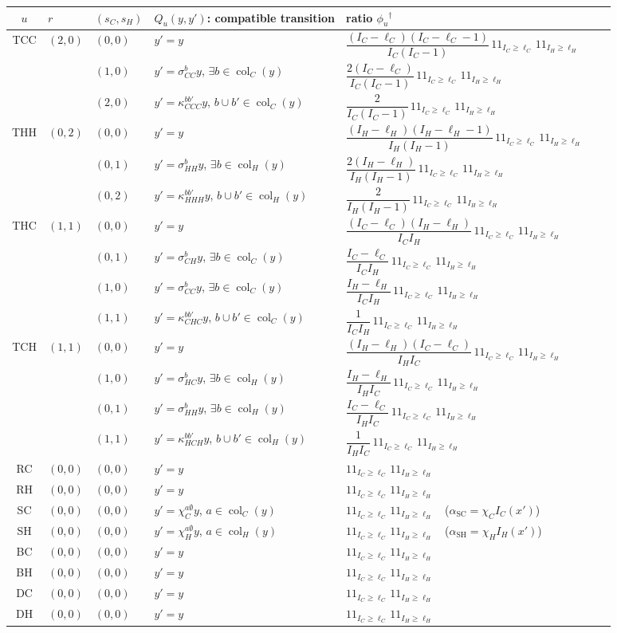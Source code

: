 \documentclass[11pt]{article}
\newcommand{\col}{\operatorname{col}}
\newcommand{\ind}{1\!\!1}
\newcommand{\Supp}{\ind_{I_C\ge\ell_C}\,\ind_{I_H\ge\ell_H}}
\theoremstyle{plain}
\begin{document}
\begin{center}
{\small
\renewcommand{\arraystretch}{1.5}
\begin{tabular}{clllllc}
\toprule
$u$ & $r$ & $(s_C,s_H)$ & $Q_u(y,y')$: compatible transition & ratio $\phi_u$$^\dagger$\\
\midrule
TCC & $(2,0)$ & $(0,0)$ & $y'=y$ & $\dfrac{(I_C-\ell_C)(I_C-\ell_C-1)}{I_C(I_C-1)}\,\Supp$\\
&& $(1,0)$ & $y'=\sigma^b_{CC}y$, $\exists b\in\col_C(y)$ & $\dfrac{2(I_C-\ell_C)}{I_C(I_C-1)}\,\Supp$\\
&& $(2,0)$ & $y'=\kappa^{bb'}_{CCC}y$, $b\cup b'\in\col_C(y)$ & $\dfrac{2}{I_C(I_C-1)}\,\Supp$\\
THH & $(0,2)$ & $(0,0)$ & $y'=y$ & $\dfrac{(I_H-\ell_H)(I_H-\ell_H-1)}{I_H(I_H-1)}\,\Supp$\\
&& $(0,1)$ & $y'=\sigma^b_{HH}y$, $\exists b\in\col_H(y)$ & $\dfrac{2(I_H-\ell_H)}{I_H(I_H-1)}\,\Supp$\\
&& $(0,2)$ & $y'=\kappa^{bb'}_{HHH}y$, $b\cup b'\in\col_H(y)$ & $\dfrac{2}{I_H(I_H-1)}\,\Supp$\\
THC & $(1,1)$ & $(0,0)$ & $y'=y$ & $\dfrac{(I_C-\ell_C)(I_H-\ell_H)}{I_CI_H}\,\Supp$\\
&& $(0,1)$ & $y'=\sigma^b_{CH}y$, $\exists b\in\col_C(y)$ & $\dfrac{I_C-\ell_C}{I_CI_H}\,\Supp$\\
&& $(1,0)$ & $y'=\sigma^b_{CC}y$, $\exists b\in\col_C(y)$ & $\dfrac{I_H-\ell_H}{I_CI_H}\,\Supp$\\
&& $(1,1)$ & $y'=\kappa^{bb'}_{CHC}y$, $b\cup b'\in\col_C(y)$ & $\dfrac{1}{I_CI_H}\,\Supp$\\
TCH & $(1,1)$ & $(0,0)$ & $y'=y$ & $\dfrac{(I_H-\ell_H)(I_C-\ell_C)}{I_HI_C}\,\Supp$\\
&& $(1,0)$ & $y'=\sigma^b_{HC}y$, $\exists b\in\col_H(y)$ & $\dfrac{I_H-\ell_H}{I_HI_C}\,\Supp$\\
&& $(0,1)$ & $y'=\sigma^b_{HH}y$, $\exists b\in\col_H(y)$ & $\dfrac{I_C-\ell_C}{I_HI_C}\,\Supp$\\
&& $(1,1)$ & $y'=\kappa^{bb'}_{HCH}y$, $b\cup b'\in\col_H(y)$ & $\dfrac{1}{I_HI_C}\,\Supp$\\
RC & $(0,0)$ & $(0,0)$ & $y'=y$ & $\Supp$\\
RH & $(0,0)$ & $(0,0)$ & $y'=y$ & $\Supp$\\
SC & $(0,0)$ & $(0,0)$ & $y'=\chi^{a\emptyset}_C y$, $a\in\col_C(y)$ & $\Supp$\ \ ($\alpha_{\mathrm{SC}}=\chi_C I_C(x')$)\\
SH & $(0,0)$ & $(0,0)$ & $y'=\chi^{a\emptyset}_H y$, $a\in\col_H(y)$ & $\Supp$\ \ ($\alpha_{\mathrm{SH}}=\chi_H I_H(x')$)\\
BC & $(0,0)$ & $(0,0)$ & $y'=y$ & $\Supp$\\
BH & $(0,0)$ & $(0,0)$ & $y'=y$ & $\Supp$\\
DC & $(0,0)$ & $(0,0)$ & $y'=y$ & $\Supp$\\
DH & $(0,0)$ & $(0,0)$ & $y'=y$ & $\Supp$\\
\bottomrule
\end{tabular}}
\end{center}
\end{document}
